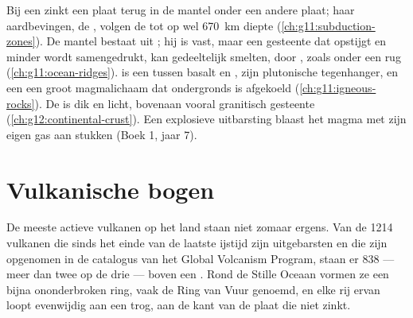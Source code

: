 \begin{recall}
Bij een  zinkt een plaat  terug in de
mantel onder een andere plaat; haar aardbevingen, de ,
volgen de  tot op wel \qty{670}{km} diepte
(\cref{ch:g11:subduction-zones}). De mantel bestaat uit ; hij is
vast, maar een gesteente dat opstijgt en minder wordt samengedrukt, kan gedeeltelijk smelten, door
, zoals onder een rug (\cref{ch:g11:ocean-ridges}).
 is een  tussen basalt en ,  zijn plutonische
tegenhanger, en een  een groot magmalichaam dat ondergronds is afgekoeld
(\cref{ch:g11:igneous-rocks}). De  is dik en licht,
bovenaan vooral granitisch gesteente (\cref{ch:g12:continental-crust}). Een explosieve
uitbarsting blaast het magma met zijn eigen gas aan stukken (Boek 1, jaar 7).
\end{recall}

\section{Vulkanische bogen}

De meeste actieve vulkanen op het land staan niet zomaar ergens. Van de 1214
vulkanen die sinds het einde van de laatste ijstijd zijn uitgebarsten en die zijn opgenomen
in de catalogus van het Global Volcanism Program, staan er 838 --- meer dan twee op de
drie --- boven een . Rond de Stille Oceaan vormen ze een
bijna ononderbroken ring, vaak de Ring van Vuur genoemd, en elke rij ervan
loopt evenwijdig aan een trog, aan de kant van de plaat die niet zinkt.

